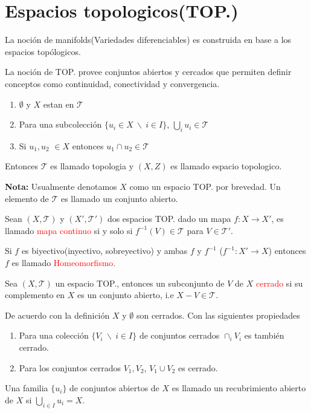\documentclass[../main]{subfiles}
\begin{document}
\section{Espacios topologicos(TOP.)}

La noción de manifolds(Variedades diferenciables) es construida en base a los espacios topólogicos.

La noción de TOP. provee conjuntos abiertos y cercados que permiten definir conceptos como continuidad, conectividad y convergencia.


\begin{enumerate}
    \item $\emptyset$ y $X$ estan en $\mathcal{T}$
    \item Para una subcolección $\{ u_i \in X \ \backslash \ i \in I\}$, $\bigcup_i u_i \in \mathcal{T}$
    \item Si $u_1, u_2$ $\in X$ entonces $u_1 \cap u_2 \in \mathcal{T}$
\end{enumerate}

Entonces $\mathcal{T}$ es llamado topologia y $(X, Z)$ es llamado espacio topologico.

\textbf{Nota:} Usualmente denotamos $X$ como un espacio TOP. por brevedad. Un elemento de $\mathcal{T}$ es llamado un conjunto abierto.

Sean $(X, \mathcal{T})$ y $(X', \mathcal{T}')$ dos espacios TOP. dado un mapa $f:X\rightarrow X'$, es llamado \textcolor{red}{mapa continuo} si y solo si $f^{-1}(V)\in \mathcal{T}$ para $V \in \mathcal{T}'$.

Si $f$ es biyectivo(inyectivo, sobreyectivo) y ambas $f$ y $f^{-1}$ ($f^{-1}: X'\rightarrow X$) entonces $f$ es llamado \textcolor{red}{Homeomorfismo.}

Sea $(X, \mathcal{T})$ un espacio TOP., entonces un subconjunto de $V$ de $X$ \textcolor{red}{cerrado} si su complemento en $X$ es un conjunto abierto, i.e $X-V \in \mathcal{T}$.

De acuerdo con la definición $X$ y $\emptyset$ son cerrados. Con las siguientes propiedades
\begin{enumerate}[label=(\alph*)]
    \item Para una colección $\{ V_i \ \backslash \ i \in I\}$ de conjuntos cerrados $\cap_i V_i$ es también cerrado.
    \item Para los conjuntos cerrados $V_1, V_2$, $V_1 \cup V_2$ es cerrado.
\end{enumerate}
Una familia $\{ u_i\}$ de conjuntos abiertos de $X$ es llamado un recubrimiento abierto de $X$ si $\bigcup_{i\in I}u_i=X$.
\end{document}
